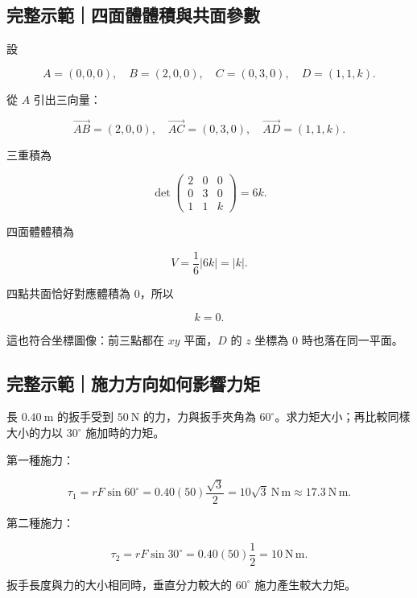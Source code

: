 \documentclass[11pt,a4paper]{article}
\begin{document}
\begin{HandoutWorkedExample}

\subsection{完整示範｜四面體體積與共面參數}\label{ux5b8cux6574ux793aux7bc4ux56dbux9762ux9ad4ux9ad4ux7a4dux8207ux5171ux9762ux53c3ux6578}

設

\[
A=(0,0,0),\quad B=(2,0,0),\quad C=(0,3,0),\quad D=(1,1,k).
\]

從 \(A\) 引出三向量：

\[
\overrightarrow{AB}=(2,0,0),\quad
\overrightarrow{AC}=(0,3,0),\quad
\overrightarrow{AD}=(1,1,k).
\]

三重積為

\[
\det
\begin{pmatrix}
2&0&0\\
0&3&0\\
1&1&k
\end{pmatrix}
=6k.
\]

四面體體積為

\[
V=\frac16|6k|=\boxed{|k|}.
\]

四點共面恰好對應體積為 \(0\)，所以

\[
\boxed{k=0}.
\]

這也符合坐標圖像：前三點都在 \(xy\) 平面，\(D\) 的 \(z\) 坐標為 \(0\) 時也落在同一平面。

\end{HandoutWorkedExample}

\begin{HandoutWorkedExample}

\subsection{完整示範｜施力方向如何影響力矩}\label{ux5b8cux6574ux793aux7bc4ux65bdux529bux65b9ux5411ux5982ux4f55ux5f71ux97ffux529bux77e9}

長 \(0.40\ \mathrm{m}\) 的扳手受到 \(50\ \mathrm{N}\) 的力，力與扳手夾角為 \(60^\circ\)。求力矩大小；再比較同樣大小的力以 \(30^\circ\) 施加時的力矩。

第一種施力：

\[
\tau_1=rF\sin60^\circ
=0.40(50)\frac{\sqrt3}{2}
=10\sqrt3\ \mathrm{N\,m}
\approx17.3\ \mathrm{N\,m}.
\]

第二種施力：

\[
\tau_2=rF\sin30^\circ
=0.40(50)\frac12
=10\ \mathrm{N\,m}.
\]

扳手長度與力的大小相同時，垂直分力較大的 \(60^\circ\) 施力產生較大力矩。

\end{HandoutWorkedExample}
\end{document}
